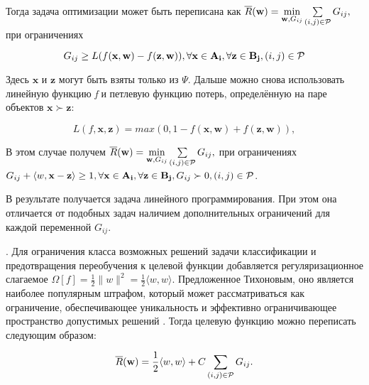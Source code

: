 \documentclass[10pt,a5paper,oneside]{article}
\begin{document}
\par
Тогда задача оптимизации может быть переписана как \(\overline{R}(\mathbf{w}) = \underset{\mathbf{w}, G_{ij}}{\operatorname{min}} \sum \limits_{(i, j) \in \mathcal{P}} G_{ij},\) при ограничениях

\[
G_{ij} \geq L (f(\mathbf{x}, \mathbf{w}) - f(\mathbf{z}, \mathbf{w})), \forall \mathbf{x} \in \mathbf{A_i}, \forall \mathbf{z} \in \mathbf{B_j}, (i, j) \in \mathcal{P}
\]

\par
Здесь \(\mathbf{x}\) и \(\mathbf{z}\) могут быть взяты только из \(\Psi\). 
Дальше можно снова использовать линейную функцию \emph{f} и петлевую функцию потерь, определённую на паре объектов \(\mathbf{x} \succ \mathbf{z}\):

\[
L(f, \mathbf{x}, \mathbf{z}) = max (0,1 - f(\mathbf{x}, \mathbf{w}) + f(\mathbf{z}, \mathbf{w})),
\]

\par
В этом случае получем \(\overline{R}(\mathbf{w}) = \underset{\mathbf{w}, G_{ij}}{\operatorname{min}} \sum \limits_{(i, j) \in \mathcal{P}} G_{ij},
\) при ограничениях \(G_{ij} + \langle w, \mathbf{x} - \mathbf{z} \rangle \geq 1, \forall \mathbf{x} \in \mathbf{A_i}, \forall \mathbf{z} \in \mathbf{B_j}, G_{ij} \succ 0, (i, j) \in \mathcal{P}\).

\par
В результате получается задача линейного программирования. 
При этом она отличается от подобных задач наличием дополнительных ограничений для каждой переменной \(G_{ij}\). 


\vspace*{1em}

\par
{}. 
Для ограничения класса возможных решений задачи классификации и предотвращения переобучения к целевой функции добавляется регуляризационное слагаемое \(\Omega[f] = \frac{1}{2}\|w\|^2 = \frac{1}{2} \langle w, w \rangle \). 
Предложенное Тихоновым, оно является наиболее популярным штрафом, который может рассматриваться как ограничение, обеспечивающее уникальность и эффективно ограничивающее пространство допустимых решений . Тогда целевую функцию можно переписать следующим образом:

\[
\overline{R}(\mathbf{w}) = \frac{1}{2} \langle w, w \rangle + C \sum \limits_{(i, j) \in \mathcal{P}} G_{ij}. 
\]
\end{document}
